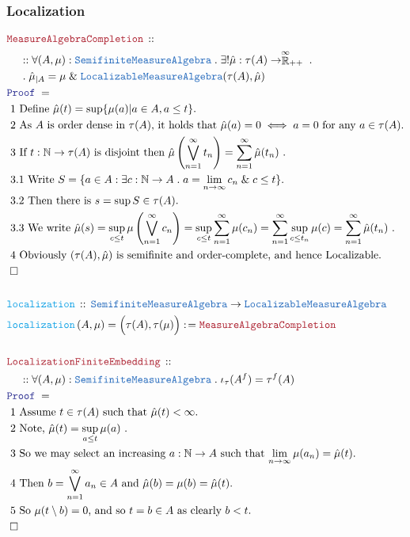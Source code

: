 \documentclass[12pt]{scrartcl}
\newcommand{\TYPE}[1]{\textcolor{NavyBlue}{\mathtt{#1}}}
\newcommand{\FUNC}[1]{\textcolor{Cerulean}{\mathtt{#1}}}
\newcommand{\LOGIC}[1]{\textcolor{Blue}{\mathtt{#1}}}
\newcommand{\THM}[1]{\textcolor{Maroon}{\mathtt{#1}}}
\renewcommand{\.}{\; . \;}
\newcommand{\de}{: \kern 0.1pc =}
\newcommand{\Act}[1]{\left( #1 \right)}
\newcommand{\Theorem}[2]{& \THM{#1} \, :: \, #2 \\ & \Proof = \\ }
\newcommand{\DeclareFunc}[2]{& \FUNC{#1} \, :: \, #2 \\}
\newcommand{\DefineNamedFunc}[4]{&  \FUNC{#1}\Act{#2} = #3 \de #4 \\}
\newcommand{\NewLine}{\\ & \kern 1pc}
\newcommand{\Page}[1]{ \begin{align*} #1 \end{align*}   }
\renewcommand{\And}{\; \& \;}
\newcommand{\Nat}{\mathbb{N} }
\newcommand{\EReals}{\stackrel{\mathclap{\infty}}{\mathbb{R}}}
\newcommand{\QED}{\; \square}
\newcommand{\EndProof}{& \QED \\}
\newcommand{\Proof}{\LOGIC{Proof} \; }
\newcommand{\Explain}[1]{& \text{#1.} \\}
\newcommand{\Semifinite}{\TYPE{Semifinite}}
\newcommand{\Loc}{\TYPE{Localizable}}
\newcommand{\MA}{\TYPE{MeasureAlgebra}}
\begin{document}
\subsubsection{Localization}
\Page{
	\Theorem{MeasureAlgebraCompletion}
	{
		\NewLine ::		
		\forall (A,\mu) : \Semifinite\MA \.
		\exists! \hat \mu : \tau(A) \to \EReals_{++} \. \NewLine \.
		\hat \mu_{|A} = \mu  \And \Loc\MA(\tau(A),\hat \mu) 
	}
	\Explain{ 1 Define $\hat \mu(t) =  \sup \{ \mu(a) | a \in A, a \le t \}$}
	\Explain{ 2 As $A$ is order dense in $\tau(A)$, it holds that $\hat\mu(a) = 0\iff a = 0$ 
		for any $a \in \tau(A)$}
	\Explain{ 3 If $t : \Nat \to \tau(A)$ is disjoint then 
		$\hat \mu\left( \bigvee_{n=1}^\infty t_n\right) = \sum^\infty_{n=1} \hat \mu(t_n) $
	}
	\Explain{ 3.1 Write $S = 
		\{ a \in A : \exists c : \Nat \to A \.  a = \lim_{n \to \infty} c_n \And c \le t  \}$}
	\Explain{ 3.2 Then there is $s = \sup S \in \tau(A)$}
	\Explain{ 3.3 We write 
		$
			\hat \mu(s) = \sup_{c \le t } \mu\left( \bigvee^\infty_{n=1} c_n \right) =
			\sup_{c \le t} \sum^\infty_{n=1} \mu(c_n) = 
			\sum^\infty_{n=1} \sup_{c \le t_n} \mu(c) =
			\sum^\infty_{n=1} \hat \mu(t_n)
		$ }
	\Explain{ 4 Obviously $(\tau(A),\hat \mu)$ is semifinite and order-complete, and hence Localizable}
	\EndProof
	\\
	\DeclareFunc{localization}
	{
		\Semifinite\MA \to \Loc\MA
	}
	\DefineNamedFunc{localization}{A,\mu}{\Big(\tau(A),\tau(\mu)\Big)}
	{
		\THM{MeasureAlgebraCompletion}	
	}
	\\
	\Theorem{LocalizationFiniteEmbedding}
	{
		\NewLine ::		
		\forall (A,\mu) : \Semifinite\MA \.
		\iota_\tau(A^f) =  \tau^f(A) 
	}
	\Explain{ 1 Assume $t \in \tau(A)$ such that $\hat \mu(t) < \infty$}
	\Explain{ 2 Note, $\hat \mu(t) = \sup_{a \le t} \mu(a)$ }
	\Explain{ 3 So we may select an increasing $a : \Nat \to A$
		such that $\lim_{n \to \infty} \mu(a_n) = \hat \mu(t)$}
	\Explain{ 4 Then $b = \bigvee^\infty_{n=1} a_n \in A$ and $\hat \mu(b) = \mu(b) = \hat \mu(t)$}
	\Explain{ 5 So $\mu(t \setminus b) = 0$, and  so $t = b \in A$ as clearly $b < t$}
	\EndProof
}
\newpage
\end{document}
